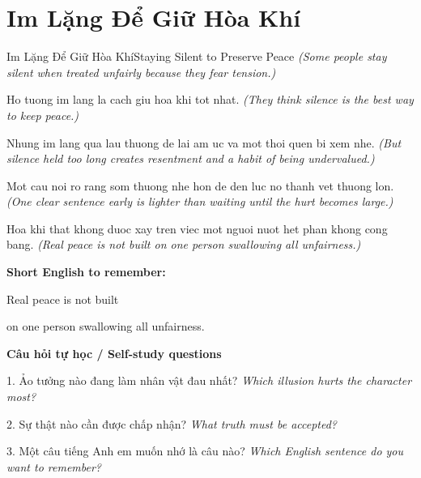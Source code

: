 \section{Im Lặng Để Giữ Hòa Khí}
\begin{truyen}{Im Lặng Để Giữ Hòa Khí}{Staying Silent to Preserve Peace}
\textit{(Some people stay silent when treated unfairly because they fear tension.)}

Ho tuong im lang la cach giu hoa khi tot nhat.
\textit{(They think silence is the best way to keep peace.)}

Nhung im lang qua lau thuong de lai am uc va mot thoi quen bi xem nhe.
\textit{(But silence held too long creates resentment and a habit of being undervalued.)}

Mot cau noi ro rang som thuong nhe hon de den luc no thanh vet thuong lon.
\textit{(One clear sentence early is lighter than waiting until the hurt becomes large.)}

\end{truyen}

\begin{baihoc}
Hoa khi that khong duoc xay tren viec mot nguoi nuot het phan khong cong bang.
\textit{(Real peace is not built on one person swallowing all unfairness.)}
\end{baihoc}

\begin{ghinhoanh}
\textbf{Short English to remember:}

Real peace is not built

on one person swallowing all unfairness.

\end{ghinhoanh}

\begin{tuhocnhanh}
\textbf{Câu hỏi tự học / Self-study questions}

1. Ảo tưởng nào đang làm nhân vật đau nhất? \textit{Which illusion hurts the character most?}

2. Sự thật nào cần được chấp nhận? \textit{What truth must be accepted?}

3. Một câu tiếng Anh em muốn nhớ là câu nào? \textit{Which English sentence do you want to remember?}
\end{tuhocnhanh}
\ngancach

